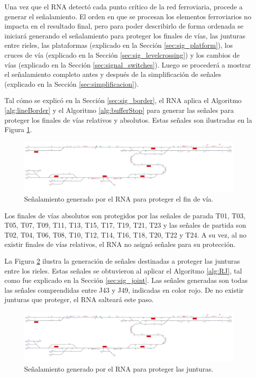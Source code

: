 	Una vez que el RNA detectó cada punto crítico de la red ferroviaria, procede a generar el señalamiento. El orden en que se procesan los elementos ferroviarios no impacta en el resultado final, pero para poder describirlo de forma ordenada se iniciará generando el señalamiento para proteger los finales de vías, las junturas entre rieles, las plataformas (explicado en la Sección \ref{sec:sig_platform}), los cruces de vía (explicado en la Sección \ref{sec:sig_levelcrossing}) y los cambios de vías (explicado en la Sección \ref{sec:signal_switches}). Luego se procederá a mostrar el señalamiento completo antes y después de la simplificación de señales (explicado en la Sección \ref{sec:simplificacion}). 
	
	Tal cómo se explicó en la Sección \ref{sec:sig_border}, el RNA aplica el Algoritmo \ref{alg:lineBorder} y el Algoritmo \ref{alg:bufferStop} para generar las señales para proteger los finales de vías relativos y absolutos. Estas señales son ilustradas en la Figura \ref{fig:EJ3_3}.
		
	\begin{figure}[H]
		\centering
		\includegraphics[width=1\textwidth]{resultados-obtenidos/ejemplo3/images/3_step1.png}
		\centering\caption{Señalamiento generado por el RNA para proteger el fin de vía.}
		\label{fig:EJ3_3}
	\end{figure}
	
	Los finales de vías absolutos son protegidos por las señales de parada T01, T03, T05, T07, T09, T11, T13, T15, T17, T19, T21, T23 y las señales de partida son T02, T04, T06, T08, T10, T12, T14, T16, T18, T20, T22 y T24. A su vez, al no existir finales de vías relativos, el RNA no asignó señales para su protección.
	
	La Figura \ref{fig:EJ3_4} ilustra la generación de señales destinadas a proteger las junturas entre los rieles. Estas señales se obtuvieron al aplicar el Algoritmo \ref{alg:RJ}, tal como fue explicado en la Sección \ref{sec:sig_joint}. Las señales generadas son todas las señales comprendidas entre J43 y J49, indicadas en color rojo. De no existir junturas que proteger, el RNA salteará este paso.
		
	\begin{figure}[H]
		\centering
		\includegraphics[width=1\textwidth]{resultados-obtenidos/ejemplo3/images/3_step2.png}
		\centering\caption{Señalamiento generado por el RNA para proteger las junturas.}
		\label{fig:EJ3_4}
	\end{figure}
	
